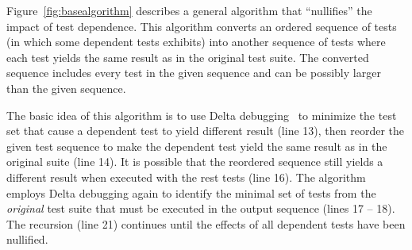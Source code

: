 Figure~\ref{fig:basealgorithm} describes a general algorithm that
``nullifies'' the impact of test dependence. This algorithm converts
an ordered sequence of tests (in which some dependent tests exhibits)
into another sequence of tests where each test yields the same result
as in the original test suite. The converted sequence includes every
test in the given sequence and can be possibly larger than the given
sequence.

The basic idea of this algorithm is to use Delta debugging~\cite{}
to minimize the test set that cause a dependent test to yield different
result (line 13), then reorder the given test sequence
to make the dependent test yield the same result as in the original
suite (line 14). It is possible that the reordered sequence still
yields a different result when executed with the rest tests (line 16).
The algorithm employs Delta debugging again to identify the minimal
set of tests from the \textit{original} test suite that must be
executed in the output sequence (lines 17 -- 18). The recursion (line 21)
continues until the effects of all dependent tests have been nullified.
